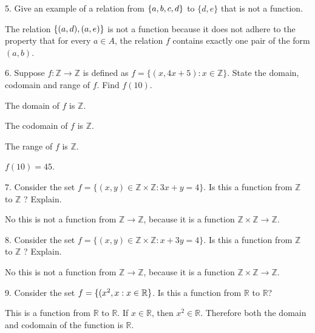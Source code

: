 \documentclass{idrisMemo}
\begin{document}
\begin{prooflist}{5. Give an example of a relation from $\{a, b, c, d\}$ to
    $\{d, e\}$ that is not a function.}
\item The relation $\{(a, d), (a, e)\}$ is not a function because it does not
    adhere to the property that for every $a \in A$, the relation $f$ contains
    exactly one pair of the form $(a, b)$.
\end{prooflist}

\begin{prooflist}{6. Suppose $f: \mathbb{Z} \rightarrow \mathbb{Z}$ is defined
as $f=\{(x, 4 x+5): x \in \mathbb{Z}\}$. State the domain, codomain and
range of $f$. Find $f(10)$.}
\item The domain of $f$ is $\mathbb{Z}$.
\item The codomain of $f$ is $\mathbb{Z}$.
\item The range of $f$ is $\mathbb{Z}$.
\item $f(10)=45$.
\end{prooflist}

\begin{prooflist}{7. Consider the set $f=\{(x, y) \in \mathbb{Z} \times
    \mathbb{Z}: 3 x+y=4\}$. Is this a function from $\mathbb{Z}$ to $\mathbb{Z}$
? Explain.}
\item No this is not a function from $\mathbb{Z}\rightarrow\mathbb{Z}$, because
    it is a function $\mathbb{Z}\times\mathbb{Z}\rightarrow\mathbb{Z}$.
\end{prooflist}

\begin{prooflist}{8. Consider the set $f=\{(x, y) \in \mathbb{Z} \times
    \mathbb{Z}: x+3 y=4\}$. Is this a function from $\mathbb{Z}$ to $\mathbb{Z}$
? Explain.}
\item No this is not a function from $\mathbb{Z}\rightarrow\mathbb{Z}$, because
    it is a function $\mathbb{Z}\times\mathbb{Z}\rightarrow\mathbb{Z}$.
\end{prooflist}

\begin{prooflist}{9. Consider the set $f=\{(x^2, x: x \in
    \mathbb{R}\}$. Is this a function from $\mathbb{R}$ to $\mathbb{R}$?}
\item This is a function from $\mathbb{R}$ to $\mathbb{R}$. If $x\in \mathbb{R}$, then
    $x^2 \in \mathbb{R}$. Therefore both the domain and codomain of the function
    is $\mathbb{R}$.
\end{prooflist}
\end{document}
